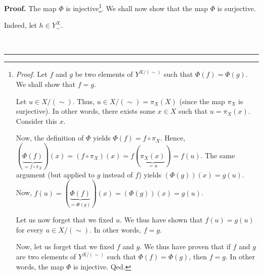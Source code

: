 \documentclass[numbers=enddot,12pt,final,onecolumn,notitlepage]{scrartcl}%
\theoremstyle{definition}
\newenvironment{proof}[1][Proof]{\noindent\textbf{#1.} }{\ \rule{0.5em}{0.5em}}
\newenvironment{verlong}{}{}
\begin{document}
\begin{verlong}
\begin{proof}
The map $\Phi$ is injective\footnote{\textit{Proof.} Let $f$ and $g$ be two
elements of $Y^{X/\left(  \sim\right)  }$ such that $\Phi\left(  f\right)
=\Phi\left(  g\right)  $. We shall show that $f=g$.
\par
Let $u\in X/\left(  \sim\right)  $. Thus, $u\in X/\left(  \sim\right)
=\pi_{X}\left(  X\right)  $ (since the map $\pi_{X}$ is surjective). In other
words, there exists some $x\in X$ such that $u=\pi_{X}\left(  x\right)  $.
Consider this $x$.
\par
Now, the definition of $\Phi$ yields $\Phi\left(  f\right)  =f\circ\pi_{X}$.
Hence, $\left(  \underbrace{\Phi\left(  f\right)  }_{=f\circ\pi_{X}}\right)
\left(  x\right)  =\left(  f\circ\pi_{X}\right)  \left(  x\right)  =f\left(
\underbrace{\pi_{X}\left(  x\right)  }_{=u}\right)  =f\left(  u\right)  $. The
same argument (but applied to $g$ instead of $f$) yields $\left(  \Phi\left(
g\right)  \right)  \left(  x\right)  =g\left(  u\right)  $. Now, $f\left(
u\right)  =\left(  \underbrace{\Phi\left(  f\right)  }_{=\Phi\left(  g\right)
}\right)  \left(  x\right)  =\left(  \Phi\left(  g\right)  \right)  \left(
x\right)  =g\left(  u\right)  $.
\par
Let us now forget that we fixed $u$. We thus have shown that $f\left(
u\right)  =g\left(  u\right)  $ for every $u\in X/\left(  \sim\right)  $. In
other words, $f=g$.
\par
Now, let us forget that we fixed $f$ and $g$. We thus have proven that if $f$
and $g$ are two elements of $Y^{X/\left(  \sim\right)  }$ such that
$\Phi\left(  f\right)  =\Phi\left(  g\right)  $, then $f=g$. In other words,
the map $\Phi$ is injective. Qed.}. We shall now show that the map $\Phi$ is surjective.

Indeed, let $h\in Y_{\sim}^{X}$.


\end{proof}
\end{verlong}
\end{document}
